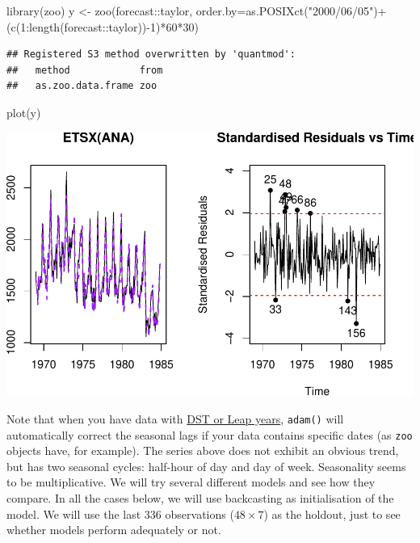 \documentclass[
]{book}
\newenvironment{Shaded}{\begin{snugshade}}{\end{snugshade}}
\newcommand{\AttributeTok}[1]{\textcolor[rgb]{0.77,0.63,0.00}{#1}}
\newcommand{\DecValTok}[1]{\textcolor[rgb]{0.00,0.00,0.81}{#1}}
\newcommand{\FunctionTok}[1]{\textcolor[rgb]{0.00,0.00,0.00}{#1}}
\newcommand{\NormalTok}[1]{#1}
\newcommand{\OtherTok}[1]{\textcolor[rgb]{0.56,0.35,0.01}{#1}}
\newcommand{\SpecialCharTok}[1]{\textcolor[rgb]{0.00,0.00,0.00}{#1}}
\newcommand{\StringTok}[1]{\textcolor[rgb]{0.31,0.60,0.02}{#1}}
\theoremstyle{definition}
\theoremstyle{definition}
\theoremstyle{definition}
\theoremstyle{definition}
\theoremstyle{remark}
\begin{document}
\begin{Shaded}
\begin{Highlighting}[]
\FunctionTok{library}\NormalTok{(zoo)}
\NormalTok{y }\OtherTok{\textless{}{-}} \FunctionTok{zoo}\NormalTok{(forecast}\SpecialCharTok{::}\NormalTok{taylor,}
         \AttributeTok{order.by=}\FunctionTok{as.POSIXct}\NormalTok{(}\StringTok{"2000/06/05"}\NormalTok{)}\SpecialCharTok{+}
\NormalTok{           (}\FunctionTok{c}\NormalTok{(}\DecValTok{1}\SpecialCharTok{:}\FunctionTok{length}\NormalTok{(forecast}\SpecialCharTok{::}\NormalTok{taylor))}\SpecialCharTok{{-}}\DecValTok{1}\NormalTok{)}\SpecialCharTok{*}\DecValTok{60}\SpecialCharTok{*}\DecValTok{30}\NormalTok{)}
\end{Highlighting}
\end{Shaded}

\begin{verbatim}
## Registered S3 method overwritten by 'quantmod':
##   method            from
##   as.zoo.data.frame zoo
\end{verbatim}

\begin{Shaded}
\begin{Highlighting}[]
\FunctionTok{plot}\NormalTok{(y)}
\end{Highlighting}
\end{Shaded}

\includegraphics{adam_files/figure-latex/unnamed-chunk-103-1.pdf}

Note that when you have data with \protect\hyperlink{MultipleFrequenciesDSTandLeap}{DST or Leap years}, \texttt{adam()} will automatically correct the seasonal lags if your data contains specific dates (as \texttt{zoo} objects have, for example). The series above does not exhibit an obvious trend, but has two seasonal cycles: half-hour of day and day of week. Seasonality seems to be multiplicative. We will try several different models and see how they compare. In all the cases below, we will use backcasting as initialisation of the model. We will use the last 336 observations (\(48 \times 7\)) as the holdout, just to see whether models perform adequately or not.
\end{document}
